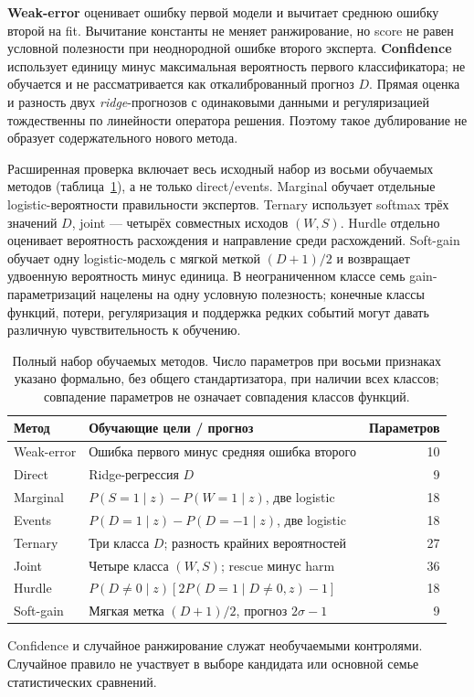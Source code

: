 \textbf{Weak-error} оценивает ошибку первой модели и вычитает среднюю
ошибку второй на fit. Вычитание константы не меняет ранжирование,
но score не равен условной полезности при неоднородной ошибке второго
эксперта. \textbf{Confidence} использует единицу минус максимальная
вероятность первого классификатора; не обучается и не рассматривается
как откалиброванный прогноз $D$.
Прямая оценка и разность двух \emph{ridge}-прогнозов с одинаковыми
данными и регуляризацией тождественны по линейности оператора решения.
Поэтому такое дублирование не образует содержательного нового метода.

Расширенная проверка включает весь исходный набор из восьми обучаемых
методов (таблица~\ref{tab:all_methods}), а не только direct/events.
Marginal обучает отдельные logistic-вероятности правильности экспертов.
Ternary использует softmax трёх значений $D$, joint --- четырёх
совместных исходов $(W,S)$. Hurdle отдельно оценивает вероятность
расхождения и направление среди расхождений. Soft-gain обучает
одну logistic-модель с мягкой меткой $(D+1)/2$ и возвращает
удвоенную вероятность минус единица. В неограниченном классе семь
gain-параметризаций нацелены на одну условную полезность;
конечные классы функций, потери, регуляризация и поддержка редких
событий могут давать различную чувствительность к обучению.

\begin{table}[htbp]\centering\small
\caption{Полный набор обучаемых методов. Число параметров при восьми
признаках указано формально, без общего стандартизатора, при наличии
всех классов; совпадение параметров не означает совпадения классов функций.}
\label{tab:all_methods}
\begin{tabular}{llr}
\toprule
Метод & Обучающие цели / прогноз & Параметров \\
\midrule
Weak-error & Ошибка первого минус средняя ошибка второго & 10 \\
Direct & Ridge-регрессия $D$ & 9 \\
Marginal & $P(S=1\mid z)-P(W=1\mid z)$, две logistic & 18 \\
Events & $P(D=1\mid z)-P(D=-1\mid z)$, две logistic & 18 \\
Ternary & Три класса $D$; разность крайних вероятностей & 27 \\
Joint & Четыре класса $(W,S)$; rescue минус harm & 36 \\
Hurdle & $P(D\ne0\mid z)[2P(D=1\mid D\ne0,z)-1]$ & 18 \\
Soft-gain & Мягкая метка $(D+1)/2$, прогноз $2\sigma-1$ & 9 \\
\bottomrule
\end{tabular}
\end{table}
Confidence и случайное ранжирование служат необучаемыми контролями.
Случайное правило не участвует в выборе кандидата или основной
семье статистических сравнений.

